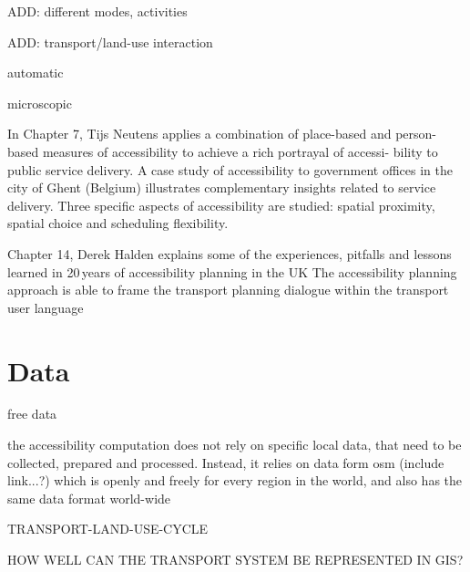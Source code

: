ADD: different modes, activities

ADD: transport/land-use interaction

automatic

microscopic




In Chapter 7, Tijs Neutens applies a combination of place-based and person-based measures of accessibility to achieve 
a rich portrayal of accessi- bility to public service delivery. A case study of accessibility to government offices 
in the city of Ghent (Belgium) illustrates complementary insights related to service delivery. Three specific aspects 
of accessibility are studied: spatial proximity, spatial choice and scheduling flexibility.

Chapter 14, Derek Halden explains some of the experiences, pitfalls and lessons learned in 20\,years of accessibility 
planning in the UK The accessibility planning approach is able to frame the transport planning dialogue within 
the transport user language 


\section{Data}
free data

the accessibility computation does not rely on specific local data, that need to be collected, prepared and processed. 
Instead, it relies on data form \gls{osm} (include link...?) which is openly and freely for every region in the world, 
and also has the same data format world-wide


TRANSPORT-LAND-USE-CYCLE

HOW WELL CAN THE TRANSPORT SYSTEM BE REPRESENTED IN GIS?




